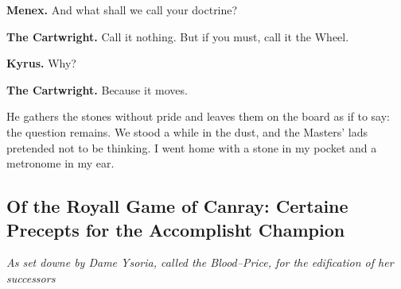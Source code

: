 \documentclass[11pt]{article}
\begin{document}
\noindent\textbf{Menex.} And what shall we call your doctrine?

\noindent\textbf{The Cartwright.} Call it nothing. But if you must, call it the Wheel.

\noindent\textbf{Kyrus.} Why?

\noindent\textbf{The Cartwright.} Because it moves.

\medskip
He gathers the stones without pride and leaves them on the board as if to say: the question remains. We stood a while in the dust, and the Masters’ lads pretended not to be thinking. I went home with a stone in my pocket and a metronome in my ear.
\clearpage

\subsection{Of the Royall Game of Canray: Certaine Precepts for the Accomplisht Champion}
\noindent\textit{As set downe by Dame Ysoria, called the Blood--Price, for the edification of her successors}
\end{document}

